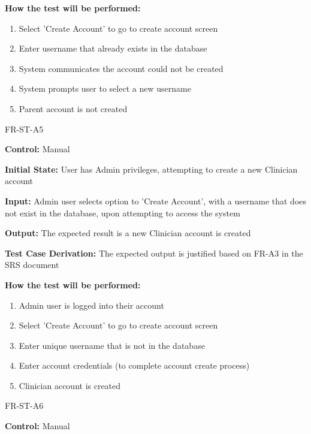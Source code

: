 \documentclass[12pt, titlepage]{article}
\begin{document}
\begin{itemize}
\begin{item}
\begin{mdframed}[linewidth=0.5mm]
      \textbf{How the test will be performed:}
      \begin{enumerate}[noitemsep]
        \item Select 'Create Account' to go to create account screen
        \item Enter username that already exists in the database
        \item System communicates the account could not be created
        \item System prompts user to select a new username
        \item Parent account is not created
      \end{enumerate}
  \end{mdframed}
  \end{item}
\begin{item}
  FR-ST-A5
  \begin{mdframed}[linewidth=0.5mm]
    \textbf{Control:} Manual \par
    \textbf{Initial State:} User has Admin privileges, attempting to create a new Clinician account \par
    \textbf{Input:} Admin user selects option to 'Create Account', with a username that does not exist in the database, upon attempting to access the system \par
    \textbf{Output:} The expected result is a new Clinician account is created \par
    \textbf{Test Case Derivation:} The expected output is justified based on FR-A3 in the SRS document \par
    \textbf{How the test will be performed:}
    \begin{enumerate}[noitemsep]
      \item Admin user is logged into their account
      \item Select 'Create Account' to go to create account screen
      \item Enter unique username that is not in the database
      \item Enter account credentials (to complete account create process)
      \item Clinician account is created
    \end{enumerate}
\end{mdframed}
\end{item}
\begin{item}
  FR-ST-A6
  \begin{mdframed}[linewidth=0.5mm]
    \textbf{Control:} Manual \par

\end{mdframed}
\end{item}
\end{itemize}
\end{document}
